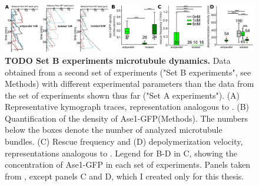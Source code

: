 \begin{figure}[h]
    \centering
    \includegraphics[width=1\linewidth]{Figures/ase1_1e.png}
    \caption[TODO Set B experiments microtubule dynamics.]{
    \textbf{TODO Set B experiments microtubule dynamics.} Data obtained from a second set of experiments ("Set B experiments", see Methods) with different experimental parameters than the data from the set of experiments shown thus far ("Set A experiments"). (A) Representative kymograph traces, representation analogous to . (B) Quantification of the density of Ase1-GFP(Methods). The numbers below the boxes denote the number of analyzed microtubule bundles. (C) Rescue frequency and (D) depolymerization velocity, representations analogous to . Legend for B-D in C, showing the concentration of Ase1-GFP in each set of experiments. Panels taken from \cite{Krattenmacher2024}, except panels C and D, which I created only for this thesis.
        }\label{ase1e}
\end{figure}

\FloatBarrier
